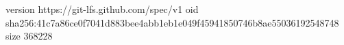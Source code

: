 version https://git-lfs.github.com/spec/v1
oid sha256:41c7a86ce0f7041d883bee4abb1eb1e049f45941850746b8ae55036192548748
size 368228
